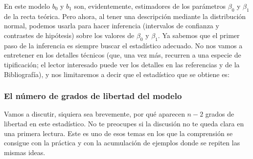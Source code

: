 En este modelo $b_0$ y $b_1$ son, evidentemente, estimadores de los parámetros $\beta_0$ y
$\beta_1$ de la recta teórica. Pero ahora, al tener una descripción mediante la distribución
normal, podemos usarla para hacer inferencia (intervalos de confianza y contrastes de hipótesis)
sobre los valores de $\beta_0$ y $\beta_1$. Ya sabemos que el primer paso de la inferencia es
siempre buscar el estadístico adecuado. No nos vamos a entretener en los detalles técnicos (que, una vez más,
recurren a una especie de tipificación; el lector interesado puede ver los detalles en las
referencias \cite{inferenciaIpinnaDurand} y \cite{garcia2009estadistica} de la Bibliografía), y nos
limitaremos a decir que el estadístico que se obtiene es:
    \begin{center}
    \end{center}

\subsubsection{El número de grados de libertad del modelo}
\label{cap10:subsubsec:NumeroGradosLibertadModelo}

Vamos a discutir, siquiera sea brevemente, por qué aparecen $n-2$ grados de libertad en este estadístico.  No te preocupes si la discusión no te queda clara en una primera lectura. Este es uno de esos temas en los que la comprensión se consigue con la práctica y con la acumulación de ejemplos donde se repiten las mismas ideas.

